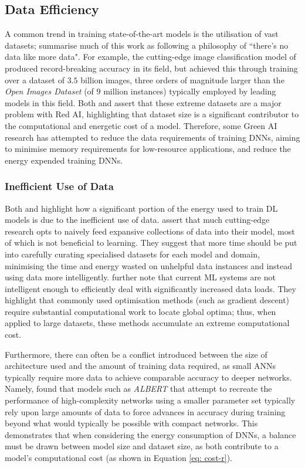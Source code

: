 \documentclass[a4paper, 11pt]{report}
\begin{document}
    \subsection{Data Efficiency}

    A common trend in training state-of-the-art models is the utilisation of vast datasets; \citet{bender-2021} summarise much of this work as following a philosophy of ``there's no data like more data". For example, the cutting-edge image classification model of \citet{mahajan-2018} produced record-breaking accuracy in its field, but achieved this through training over a dataset of $3.5$ billion images, three orders of magnitude larger than the \emph{Open Images Dataset} (of $9$ million instances) typically employed by leading models in this field. Both \citet{schwartz-2019} and \citet{bender-2021} assert that these extreme datasets are a major problem with Red AI, highlighting that dataset size is a significant contributor to the computational and energetic cost of a model. Therefore, some Green AI research has attempted to reduce the data requirements of training DNNs, aiming to minimise memory requirements for low-resource applications, and reduce the energy expended training DNNs.


    \subsubsection{Inefficient Use of Data}

    Both \citet{bender-2021} and \citet{walsh-2021} highlight how a significant portion of the energy used to train DL models is due to the inefficient use of data. \citet{bender-2021} assert that much cutting-edge research opts to naively feed expansive collections of data into their model, most of which is not beneficial to learning. They suggest that more time should be put into carefully curating specialised datasets for each model and domain, minimising the time and energy wasted on unhelpful data instances and instead using data more intelligently. \citet{aljarrah-2015} further note that current ML systems are not intelligent enough to efficiently deal with significantly increased data loads. They highlight that commonly used optimisation methods (such as gradient descent) require substantial computational work to locate global optima; thus, when applied to large datasets, these methods accumulate an extreme computational cost.

    Furthermore, there can often be a conflict introduced between the size of architecture used and the amount of training data required, as small ANNs typically require more data to achieve comparable accuracy to deeper networks. Namely, \citet{bender-2021} found that models such as \emph{ALBERT} \citep{lan-2020} that attempt to recreate the performance of high-complexity networks using a smaller parameter set typically rely upon large amounts of data to force advances in accuracy during training beyond what would typically be possible with compact networks. This demonstrates that when considering the energy consumption of DNNs, a balance must be drawn between model size and dataset size, as both contribute to a model's computational cost (as shown in Equation \ref{eq: cost-r}).
\end{document}
